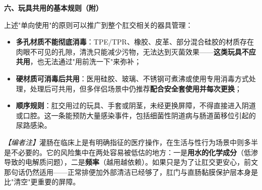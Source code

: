 \textbf{六、玩具共用的基本规则（附）}

上述"单向使用"的原则可以推广到整个肛交相关的器具管理：

\begin{itemize}
\item \textbf{多孔材质不能彻底消毒}：TPE/TPR、橡胶、皮革、部分混合硅胶的材质存在肉眼不可见的孔隙，清洗只能减少污物，无法达到灭菌效果——\textbf{这类玩具不应共用}，也无法通过"用前洗一下"来弥补；
\item \textbf{硬材质可消毒后共用}：医用硅胶、玻璃、不锈钢可煮沸或使用专用消毒方式处理，处理后可共用，但多伴侣场景中仍推荐\textbf{配合安全套使用并每次更换}；
\item \textbf{顺序规则}：肛交用过的玩具、手套或阴茎，未经更换屏障，不得直接进入阴道或口腔。这一条能预防大量感染事件，包括细菌性阴道病与肠道菌移位引起的尿路感染。
\end{itemize}

\textit{【编者注】}灌肠在临床上是有明确指征的医疗操作，在生活与性行为场景中则多半是不必要的。它的风险集中在两处容易被低估的地方：一是\textbf{用水的化学成分}（低渗导致的电解质问题），二是\textbf{频率}（越用越依赖）。如果只是为了让肛交更安心，前文那句话仍然适用——正常排便加外部清洁已经够了，肛门与直肠黏膜保护层本身是比"清空"更重要的屏障。

